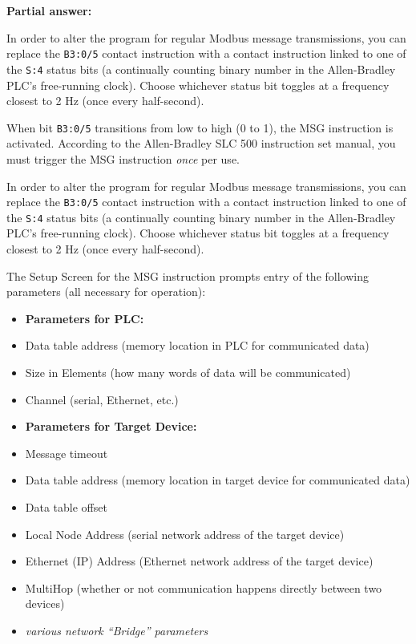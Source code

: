 





\noindent
{\bf Partial answer:}

\vskip 10pt

In order to alter the program for regular Modbus message transmissions, you can replace the {\tt B3:0/5} contact instruction with a contact instruction linked to one of the {\tt S:4} status bits (a continually counting binary number in the Allen-Bradley PLC's free-running clock).  Choose whichever status bit toggles at a frequency closest to 2 Hz (once every half-second).







When bit {\tt B3:0/5} transitions from low to high (0 to 1), the MSG instruction is activated.  According to the Allen-Bradley SLC 500 instruction set manual, you must trigger the MSG instruction {\it once} per use.

\vskip 10pt

In order to alter the program for regular Modbus message transmissions, you can replace the {\tt B3:0/5} contact instruction with a contact instruction linked to one of the {\tt S:4} status bits (a continually counting binary number in the Allen-Bradley PLC's free-running clock).  Choose whichever status bit toggles at a frequency closest to 2 Hz (once every half-second).

\vskip 10pt

The Setup Screen for the MSG instruction prompts entry of the following parameters (all necessary for operation):

\begin{itemize}
\item{} {\bf Parameters for PLC:}
\item{} Data table address (memory location in PLC for communicated data)
\item{} Size in Elements (how many words of data will be communicated)
\item{} Channel (serial, Ethernet, etc.)
\vskip 10pt
\item{} {\bf Parameters for Target Device:}
\item{} Message timeout
\item{} Data table address (memory location in target device for communicated data)
\item{} Data table offset
\item{} Local Node Address (serial network address of the target device)
\item{} Ethernet (IP) Address (Ethernet network address of the target device)
\item{} MultiHop (whether or not communication happens directly between two devices)
\item{} {\it various network ``Bridge'' parameters}
\end{itemize}




